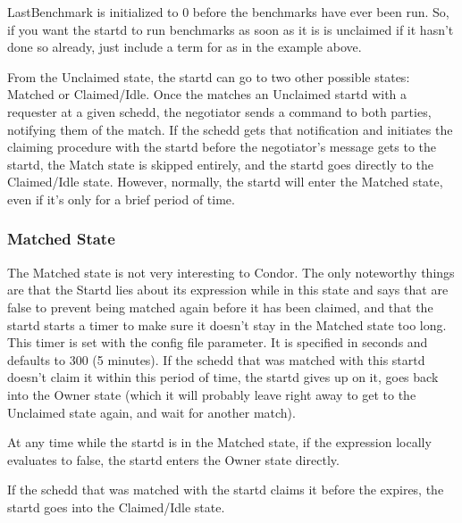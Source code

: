 \Note LastBenchmark is initialized to 0 before the benchmarks
have ever been run.  So, if you want the startd to run benchmarks as
soon as it is is unclaimed if it hasn't done so already, just include
a term for  as in the example above.

From the Unclaimed state, the startd can go to two other possible
states: Matched or Claimed/Idle.  Once the  matches
an Unclaimed startd with a requester at a given schedd, the negotiator
sends a command to both parties, notifying them of the match.  If the
schedd gets that notification and initiates the claiming procedure
with the startd before the negotiator's message gets to the startd,
the Match state is skipped entirely, and the startd goes directly to
the Claimed/Idle state.  However, normally, the startd will enter the
Matched state, even if it's only for a brief period of time.


\subsubsection{Matched State}
\label{sec:Matched-State}

The Matched state is not very interesting to Condor.  The only
noteworthy things are that the Startd lies about its 
expression while in this state and says that  are
false to prevent being matched again before it has been claimed, and
that the startd starts a timer to make sure it doesn't stay in the
Matched state too long.  This timer is set with the
 \label{param:MatchTimeout} config file
parameter.  It is specified in seconds and defaults to 300 (5
minutes).  If the schedd that was matched with this startd doesn't
claim it within this period of time, the startd gives up on it, goes
back into the Owner state (which it will probably leave right away to
get to the Unclaimed state again, and wait for another match).

At any time while the startd is in the Matched state, if the
 expression locally evaluates to false, the startd enters
the Owner state directly.

If the schedd that was matched with the startd claims it before the
 expires, the startd goes into the Claimed/Idle
state.

